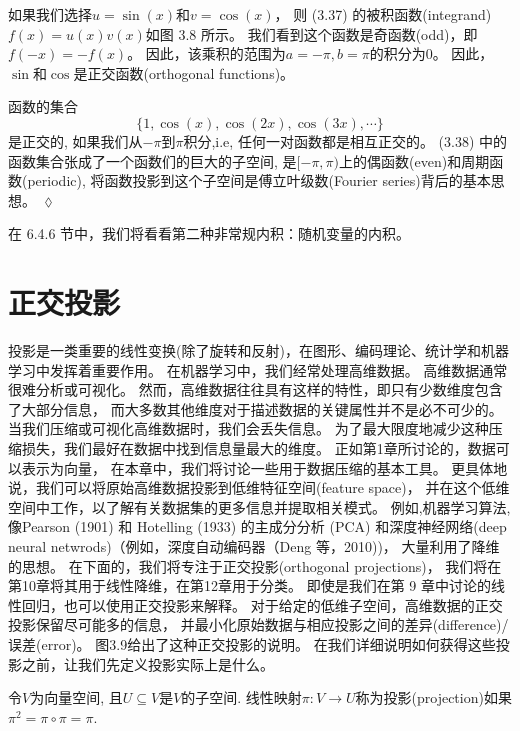 \begin{example}[函数的内积]
    如果我们选择$u = \sin(x)$和$v = \cos(x)$，
    则 (3.37) 的被积函数(integrand)$f(x) = u(x)v(x)$如图 3.8 所示。
    我们看到这个函数是奇函数(odd)，即$f(−x) = −f (x)$。
    因此，该乘积的范围为$a = −\pi, b = \pi$的积分为$0$。
    因此，$\sin$和$\cos$是正交函数(orthogonal functions)。
\end{example}
\begin{remark}
    函数的集合
    \begin{equation}
        \{1,\cos(x),\cos(2x),\cos(3x),\cdots\}
    \end{equation}
    是正交的, 如果我们从$-\pi$到$\pi$积分,i.e,
    任何一对函数都是相互正交的。
    (3.38) 中的函数集合张成了一个函数们的巨大的子空间,
    是$[−\pi, \pi)$上的偶函数(even)和周期函数(periodic),
    将函数投影到这个子空间是傅立叶级数(Fourier series)背后的基本思想。
    \hfill $\lozenge$
\end{remark}

在 6.4.6 节中，我们将看看第二种非常规内积：随机变量的内积。

\section{正交投影}
投影是一类重要的线性变换(除了旋转和反射)，在图形、编码理论、统计学和机器学习中发挥着重要作用。
在机器学习中，我们经常处理高维数据。
高维数据通常很难分析或可视化。
然而，高维数据往往具有这样的特性，即只有少数维度包含了大部分信息，
而大多数其他维度对于描述数据的关键属性并不是必不可少的。
当我们压缩或可视化高维数据时，我们会丢失信息。
为了最大限度地减少这种压缩损失，我们最好在数据中找到信息量最大的维度。
正如第1章所讨论的，数据可以表示为向量，
在本章中，我们将讨论一些用于数据压缩的基本工具。
更具体地说，我们可以将原始高维数据投影到低维特征空间(feature space)，
并在这个低维空间中工作，以了解有关数据集的更多信息并提取相关模式。
例如,机器学习算法,
像Pearson (1901) 和 Hotelling (1933) 的主成分分析 (PCA)
和深度神经网络(deep neural netwrods)（例如，深度自动编码器（Deng 等，2010))，
大量利用了降维的思想。
在下面的，我们将专注于正交投影(orthogonal projections)，
我们将在第10章将其用于线性降维，在第12章用于分类。
即使是我们在第 9 章中讨论的线性回归，也可以使用正交投影来解释。
对于给定的低维子空间，高维数据的正交投影保留尽可能多的信息，
并最小化原始数据与相应投影之间的差异(difference)/误差(error)。
图3.9给出了这种正交投影的说明。
在我们详细说明如何获得这些投影之前，让我们先定义投影实际上是什么。

\begin{definition}[投影]
    令$V$为向量空间, 且$U \subseteq V$是$V$的子空间.
    线性映射$\pi : V \rightarrow U$称为投影(projection)如果
    $\pi^2 = \pi \circ \pi = \pi$.
\end{definition}

